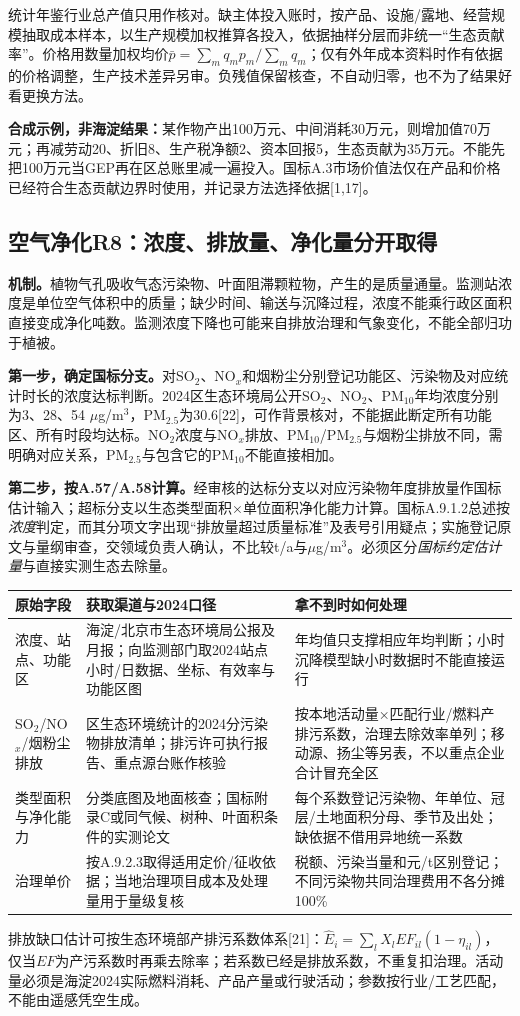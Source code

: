 \documentclass[12pt,a4paper,fontset=fandol]{ctexart}
\begin{document}
统计年鉴行业总产值只用作核对。缺主体投入账时，按产品、设施/露地、经营规模抽取成本样本，以生产规模加权推算各投入，依据抽样分层而非统一“生态贡献率”。价格用数量加权均价$\bar p=\sum_mq_mp_m/\sum_mq_m$；仅有外年成本资料时作有依据的价格调整，生产技术差异另审。负残值保留核查，不自动归零，也不为了结果好看更换方法。

\textbf{合成示例，非海淀结果：}某作物产出100万元、中间消耗30万元，则增加值70万元；再减劳动20、折旧8、生产税净额2、资本回报5，生态贡献为35万元。不能先把100万元当GEP再在区总账里减一遍投入。国标A.3市场价值法仅在产品和价格已经符合生态贡献边界时使用，并记录方法选择依据[1,17]。

\subsection{空气净化R8：浓度、排放量、净化量分开取得}
\textbf{机制。}植物气孔吸收气态污染物、叶面阻滞颗粒物，产生的是质量通量。监测站浓度是单位空气体积中的质量；缺少时间、输送与沉降过程，浓度不能乘行政区面积直接变成净化吨数。监测浓度下降也可能来自排放治理和气象变化，不能全部归功于植被。

\textbf{第一步，确定国标分支。}对SO$_2$、NO$_x$和烟粉尘分别登记功能区、污染物及对应统计时长的浓度达标判断。2024区生态环境局公开SO$_2$、NO$_2$、PM$_{10}$年均浓度分别为3、28、54 $\mu$g/m$^3$，PM$_{2.5}$为30.6[22]，可作背景核对，不能据此断定所有功能区、所有时段均达标。NO$_2$浓度与NO$_x$排放、PM$_{10}$/PM$_{2.5}$与烟粉尘排放不同，需明确对应关系，PM$_{2.5}$与包含它的PM$_{10}$不能直接相加。

\textbf{第二步，按A.57/A.58计算。}经审核的达标分支以对应污染物年度排放量作国标估计输入；超标分支以生态类型面积×单位面积净化能力计算。国标A.9.1.2总述按\emph{浓度}判定，而其分项文字出现“排放量超过质量标准”及表号引用疑点；实施登记原文与量纲审查，交领域负责人确认，不比较t/a与$\mu$g/m$^3$。必须区分\emph{国标约定估计量}与直接实测生态去除量。

\begin{longtable}{P{2.4cm}P{6.1cm}P{4.7cm}}
\toprule 原始字段 & 获取渠道与2024口径 & 拿不到时如何处理 \\\midrule\endhead
浓度、站点、功能区 & 海淀/北京市生态环境局公报及月报；向监测部门取2024站点小时/日数据、坐标、有效率与功能区图 & 年均值只支撑相应年均判断；小时沉降模型缺小时数据时不能直接运行 \\
SO$_2$/NO$_x$/烟粉尘排放 & 区生态环境统计的2024分污染物排放清单；排污许可执行报告、重点源台账作核验 & 按本地活动量×匹配行业/燃料产排污系数，治理去除效率单列；移动源、扬尘等另表，不以重点企业合计冒充全区 \\
类型面积与净化能力 & 分类底图及地面核查；国标附录C或同气候、树种、叶面积条件的实测论文 & 每个系数登记污染物、年单位、冠层/土地面积分母、季节及出处；缺依据不借用异地统一系数 \\
治理单价 & 按A.9.2.3取得适用定价/征收依据；当地治理项目成本及处理量用于量级复核 & 税额、污染当量和元/t区别登记；不同污染物共同治理费用不各分摊100\% \\
\bottomrule
\end{longtable}
排放缺口估计可按生态环境部产排污系数体系[21]：$\widehat E_i=\sum_l X_l EF_{il}(1-\eta_{il})$，仅当$EF$为产污系数时再乘去除率；若系数已经是排放系数，不重复扣治理。活动量必须是海淀2024实际燃料消耗、产品产量或行驶活动；参数按行业/工艺匹配，不能由遥感凭空生成。
\end{document}
